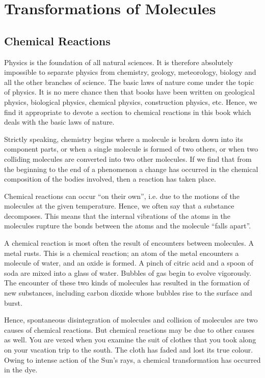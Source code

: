 

\cleardoublepage
\chapter{Transformations of Molecules}
\label{ch-07}

\section{Chemical Reactions}

Physics is the foundation of all natural sciences. It is therefore absolutely impossible to separate physics from chemistry, geology, meteorology, biology and all the other branches of science. The basic laws of nature come under the topic of physics. It is no mere chance then that books have been written on geological physics, biological phys­ics, chemical physics, construction physics, etc. Hence, we find it appropriate to devote a section to chemical reactions in this book which deals with the basic laws of nature.

Strictly speaking, chemistry begins where a molecule is broken down into its component parts, or when a single molecule is formed of two others, or when two colliding molecules are converted into two other molecules. If we find that from the beginning to the end of a phenome­non a change has occurred in the chemical composition of the bodies involved, then a reaction has taken place.

Chemical reactions can occur ``on their own'', i.e. due to the motions of the molecules at the given temperature. Hence, we often say that a substance decomposes. This means that the internal vibrations of the atoms in the molecules rupture the bonds between the atoms and the molecule ``falls apart''.

A chemical reaction is most often the result of encoun­ters between molecules. A metal rusts. This is a chemical reaction; an atom of the metal encounters a molecule of water, and an oxide is formed. A pinch of citric acid and a spoon of soda are mixed into a glass of water. Bubbles of gas begin to evolve vigorously. The encounter of these two kinds of molecules has resulted in the formation of new substances, including carbon dioxide whose bubbles rise to the surface and burst.

Hence, spontaneous disintegration of molecules and collision of molecules are two causes of chemical reactions. But chemical reactions may be due to other causes as well. You are vexed when you examine the suit of clothes that you took along on your vacation trip to the south. The cloth has faded and lost its true colour. Owing to intense action of the Sun’s rays, a chemical transforma­tion has occurred in the dye.

